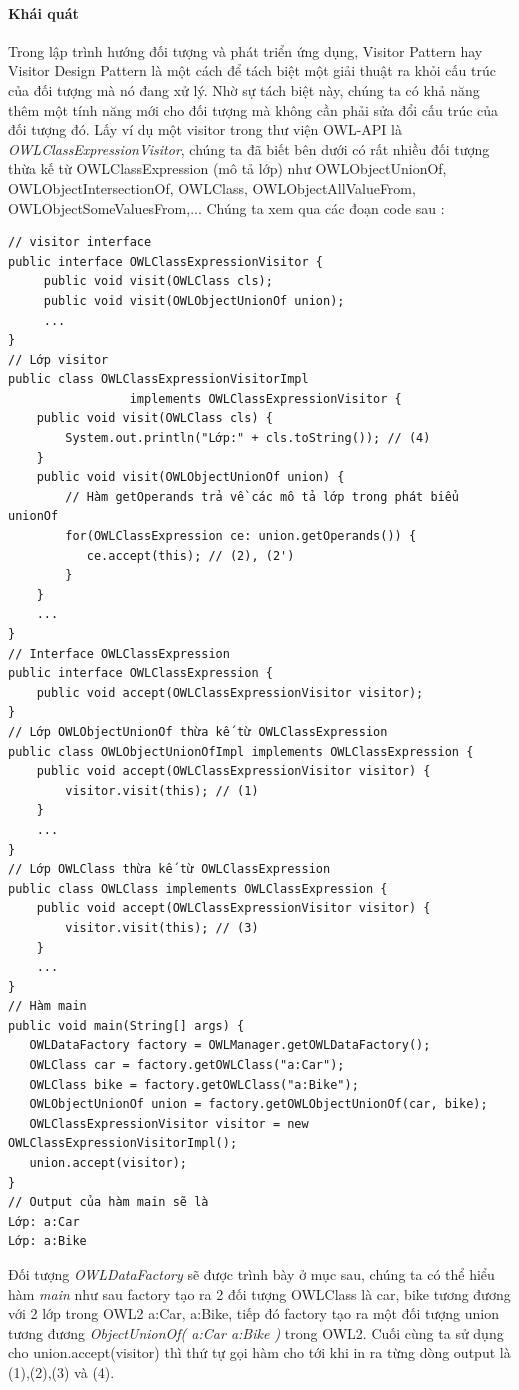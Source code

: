 \paragraph{Khái quát} Trong lập trình hướng đối tượng và phát triển ứng dụng, Visitor Pattern hay Visitor Design Pattern là một cách để tách biệt một giải thuật ra khỏi cấu trúc của đối tượng mà nó đang xử lý. Nhờ sự tách biệt này, chúng ta có khả năng thêm một tính năng mới cho đối tượng mà không cần phải sửa đổi cấu trúc của đối tượng đó. Lấy ví dụ một visitor trong thư viện OWL-API là \textit{OWLClassExpressionVisitor}, chúng ta đã biết bên dưới có rất nhiều đối tượng thừa kế từ OWLClassExpression (mô tả lớp) như OWLObjectUnionOf, OWLObjectIntersectionOf, OWLClass, OWLObjectAllValueFrom, OWLObjectSomeValuesFrom,... Chúng ta xem qua các đoạn code sau :
\begin{verbatim}
// visitor interface
public interface OWLClassExpressionVisitor {
     public void visit(OWLClass cls);
     public void visit(OWLObjectUnionOf union);
     ...
}
// Lớp visitor
public class OWLClassExpressionVisitorImpl 
                 implements OWLClassExpressionVisitor {
    public void visit(OWLClass cls) {
        System.out.println("Lớp:" + cls.toString()); // (4)
    }
    public void visit(OWLObjectUnionOf union) {
        // Hàm getOperands trả về các mô tả lớp trong phát biểu unionOf
        for(OWLClassExpression ce: union.getOperands()) {
           ce.accept(this); // (2), (2')
        }
	}
	...
}
// Interface OWLClassExpression
public interface OWLClassExpression {
    public void accept(OWLClassExpressionVisitor visitor);
}
// Lớp OWLObjectUnionOf thừa kế từ OWLClassExpression
public class OWLObjectUnionOfImpl implements OWLClassExpression {
	public void accept(OWLClassExpressionVisitor visitor) {
    	visitor.visit(this); // (1)
    }
    ...
}
// Lớp OWLClass thừa kế từ OWLClassExpression 
public class OWLClass implements OWLClassExpression {
    public void accept(OWLClassExpressionVisitor visitor) {
        visitor.visit(this); // (3)
    }
    ...
}
// Hàm main 
public void main(String[] args) {
   OWLDataFactory factory = OWLManager.getOWLDataFactory();
   OWLClass car = factory.getOWLClass("a:Car");
   OWLClass bike = factory.getOWLClass("a:Bike");
   OWLObjectUnionOf union = factory.getOWLObjectUnionOf(car, bike);
   OWLClassExpressionVisitor visitor = new OWLClassExpressionVisitorImpl();
   union.accept(visitor);                                       
}
// Output của hàm main sẽ là 
Lớp: a:Car
Lớp: a:Bike
\end{verbatim}
Đối tượng \textit{OWLDataFactory} sẽ được trình bày ở mục sau, chúng ta có thể hiểu hàm \textit{main} như sau factory tạo ra 2 đối tượng OWLClass là car, bike tương đương với 2 lớp trong OWL2 a:Car, a:Bike, tiếp đó factory tạo ra một đối tượng union tương đương \textit{ObjectUnionOf( a:Car a:Bike )} trong OWL2. Cuối cùng ta sử dụng cho union.accept(visitor) thì thứ tự gọi hàm cho tới khi in ra từng dòng output là (1),(2),(3) và (4). 
